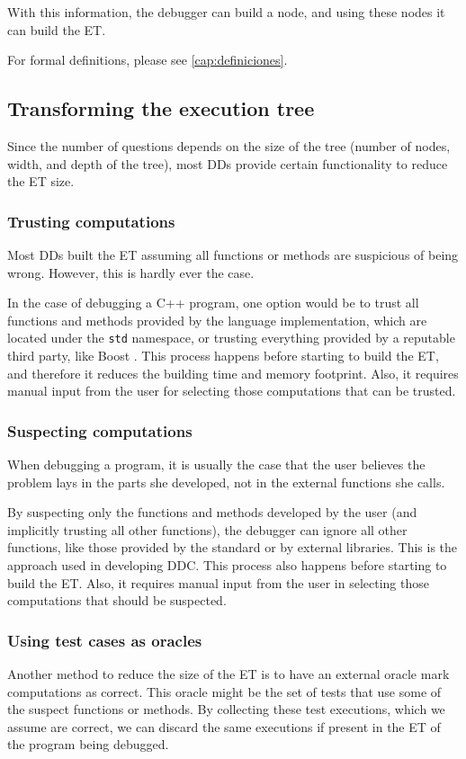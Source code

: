 With this information, the debugger can build a node, and using these nodes it can build the ET.

For formal definitions, please see \autoref{cap:definiciones}.

\subsection{Transforming the execution tree}

Since the number of questions depends on the size of the tree (number of nodes, width, and depth of the tree), most DDs provide certain functionality to reduce the ET size.

\subsubsection{Trusting computations}

Most DDs built the ET assuming all functions or methods are suspicious  of being wrong.
However, this is hardly ever the case.

In the case of debugging a C++ program, one option would be to trust all functions and methods provided by the language implementation, which are located under the \verb|std| namespace, or trusting everything provided by a reputable third party, like Boost \cite{TheBoostLibraries}.
This process happens before starting to build the ET, and therefore it reduces the building time and memory footprint. Also, it requires manual input from the user for selecting those computations that can be trusted.

\subsubsection{Suspecting computations}

When debugging a program, it is usually the case that the user believes the problem lays in the parts she developed, not in the external functions she calls.

By suspecting only the functions and methods developed by the user (and implicitly trusting all other functions), the debugger can ignore all other functions, like those provided by the standard or by external libraries.
This is the approach used in developing DDC.
This process also happens before starting to build the ET. Also, it requires manual input from the user in selecting those computations that should be suspected.
\subsubsection{Using test cases as oracles}
Another method to reduce the size of the ET is to have an external oracle mark computations as correct.
This oracle might be the set of tests that use some of the suspect functions or methods. By collecting these test executions, which we assume are correct, we can discard the same executions if present in the ET of the program being debugged.

